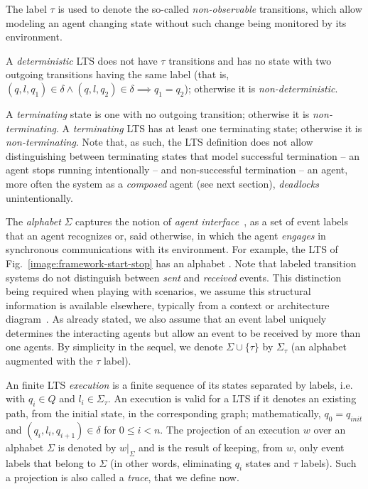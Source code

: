 The label $\tau$ is used to denote the so-called \emph{non-observable} transitions, which allow modeling an agent changing state without such change being monitored by its environment. 

A \emph{deterministic} LTS does not have $\tau$ transitions and has no state with two outgoing transitions having the same label (that is, $(q,l,q_1) \in \delta \wedge (q,l,q_2) \in \delta \implies q_1 = q_2$); otherwise it is \emph{non-deterministic}.

A \emph{terminating} state is one with no outgoing transition; otherwise it is \emph{non-terminating}. A \emph{terminating} LTS has at least one terminating state; otherwise it is \emph{non-terminating}. Note that, as such, the LTS definition does not allow distinguishing between terminating states that model successful termination -- an agent stops running intentionally -- and non-successful termination -- an agent, more often the system as a \emph{composed} agent (see next section), \emph{deadlocks} unintentionally.

The \emph{alphabet} $\Sigma$ captures the notion of \emph{agent interface}~\cite{Feather:1987}, as a set of event labels that an agent recognizes or, said otherwise, in which the agent \emph{engages} in synchronous communications with its environment. For example, the LTS of Fig.~\ref{image:framework-start-stop} has an alphabet . Note that labeled transition systems do not distinguish between \emph{sent} and \emph{received} events. This distinction being required when playing with scenarios, we assume this structural information is available elsewhere, typically from a context or architecture diagram~\cite{Ward:1985, Magee:1995}. As already stated, we also assume that an event label uniquely determines the interacting agents but allow an event to be received by more than one agents. By simplicity in the sequel, we denote $\Sigma\cup\{\tau\}$ by $\Sigma_{\tau}$ (an alphabet augmented with the $\tau$ label).

An finite LTS \emph{execution} is a finite sequence of its states separated by labels, i.e.  with $q_i \in Q$ and $l_i \in \Sigma_{\tau}$. An execution is valid for a LTS if it denotes an existing path, from the initial state, in the corresponding graph; mathematically, $q_0 = q_{init}$ and $(q_i,l_i,q_{i+1}) \in \delta$ for $0 \leq i < n$. The projection of an execution $w$ over an alphabet $\Sigma$ is denoted by $w|_{\Sigma}$ and is the result of keeping, from $w$, only event labels that belong to $\Sigma$ (in other words, eliminating $q_i$ states and $\tau$ labels). Such a projection is also called a \emph{trace}, that we define now.

